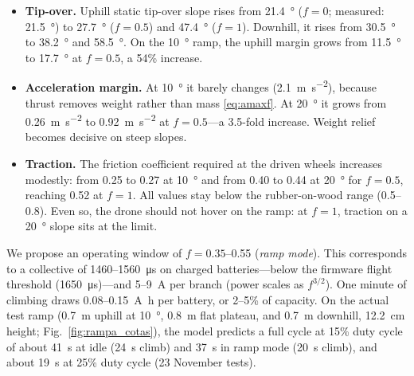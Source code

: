 \begin{itemize}
  \item \textbf{Tip-over.} Uphill static tip-over slope rises from \SI{21.4}{\degree} ($f=0$; measured: \SI{21.5}{\degree}) to \SI{27.7}{\degree} ($f=0.5$) and \SI{47.4}{\degree} ($f=1$). Downhill, it rises from \SI{30.5}{\degree} to \SI{38.2}{\degree} and \SI{58.5}{\degree}. On the \SI{10}{\degree} ramp, the uphill margin grows from \SI{11.5}{\degree} to \SI{17.7}{\degree} at $f=0.5$, a 54\% increase.
  \item \textbf{Acceleration margin.} At \SI{10}{\degree} it barely changes (\SI{2.1}{\metre\per\second\squared}), because thrust removes weight rather than mass \eqref{eq:amaxf}. At \SI{20}{\degree} it grows from \SI{0.26}{\metre\per\second\squared} to \SI{0.92}{\metre\per\second\squared} at $f=0.5$---a 3.5-fold increase. Weight relief becomes decisive on steep slopes.
  \item \textbf{Traction.} The friction coefficient required at the driven wheels increases modestly: from 0.25 to 0.27 at \SI{10}{\degree} and from 0.40 to 0.44 at \SI{20}{\degree} for $f=0.5$, reaching 0.52 at $f=1$. All values stay below the rubber-on-wood range (0.5--0.8). Even so, the drone should not hover on the ramp: at $f=1$, traction on a \SI{20}{\degree} slope sits at the limit.
\end{itemize}
We propose an operating window of $f=0.35$--0.55 (\emph{ramp mode}). This corresponds to a collective of 1460--\SI{1560}{\micro\second} on charged batteries---below the firmware flight threshold (\SI{1650}{\micro\second})---and 5--\SI{9}{\ampere} per branch (power scales as $f^{3/2}$). One minute of climbing draws 0.08--\SI{0.15}{\ampere\hour} per battery, or 2--5\% of capacity. On the actual test ramp (\SI{0.7}{\metre} uphill at \SI{10}{\degree}, \SI{0.8}{\metre} flat plateau, and \SI{0.7}{\metre} downhill, \SI{12.2}{\centi\metre} height; Fig.~\ref{fig:rampa_cotas}), the model predicts a full cycle at 15\% duty cycle of about \SI{41}{\second} at idle (\SI{24}{\second} climb) and \SI{37}{\second} in ramp mode (\SI{20}{\second} climb), and about \SI{19}{\second} at 25\% duty cycle (23 November tests).

